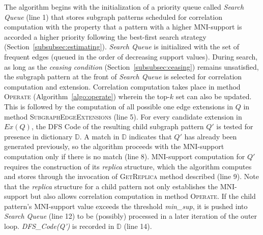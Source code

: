 The algorithm begins with the initialization of a priority queue called
\textit{Search Queue} (line 1) that stores subgraph patterns scheduled for
correlation computation with the property that a pattern with a higher
MNI-support is accorded a higher priority following the best-first search
strategy (Section~\ref{subsubsec:estimating}). \textit{Search Queue} is
initialized with the set of frequent edges (queued in the order of decreasing
support values). During search, as long as the \textit{ceasing condition}
(Section~\ref{subsubsec:ceasing}) remains unsatisfied, the subgraph pattern at
the front of \textit{Search Queue} is selected for correlation computation and
extension. Correlation computation takes place in method \textsc{Operate}
(Algorithm~\ref{algo:operate}) wherein the top-$k$ set can also be
updated. This is followed by the computation of all possible one edge extensions
in $Q$ in method \textsc{SubgraphEdgeExtensions} (line 5). For every candidate
extension in $Ex(Q)$, the DFS Code of the resulting child subgraph pattern $Q'$
is tested for presence in dictionary $\mathbb{D}$. A match in $\mathbb{D}$
indicates that $Q'$ has already been generated previously, so the algorithm
proceeds with the MNI-support computation only if there is no match (line 8).
MNI-support computation for $Q'$ requires the construction of its \textit{replica}
structure, which the algorithm computes and stores through the invocation of
\textsc{GetReplica} method described (line 9). Note that the \textit{replica} structure
for a child pattern not only establishes the MNI-support but also allows
correlation computation in method \textsc{Operate}. If the child pattern's
MNI-support value exceeds the threshold \textit{min\_sup}, it is pushed into
\textit{Search Queue} (line 12) to be (possibly) processed in a later iteration of
the outer loop. \textit{DFS\_Code(Q')} is recorded in $\mathbb{D}$ (line 14).

